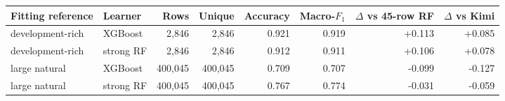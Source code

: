 \begin{tabular}{@{}llrrrrrr@{}}
\toprule
Fitting reference & Learner & Rows & Unique & Accuracy & Macro-$F_1$ & $\Delta$ vs 45-row RF & $\Delta$ vs Kimi \\
\midrule
development-rich & XGBoost & 2,846 & 2,846 & 0.921 & 0.919 & +0.113 & +0.085 \\
development-rich & strong RF & 2,846 & 2,846 & 0.912 & 0.911 & +0.106 & +0.078 \\
large natural & XGBoost & 400,045 & 400,045 & 0.709 & 0.707 & -0.099 & -0.127 \\
large natural & strong RF & 400,045 & 400,045 & 0.767 & 0.774 & -0.031 & -0.059 \\
\bottomrule
\end{tabular}
